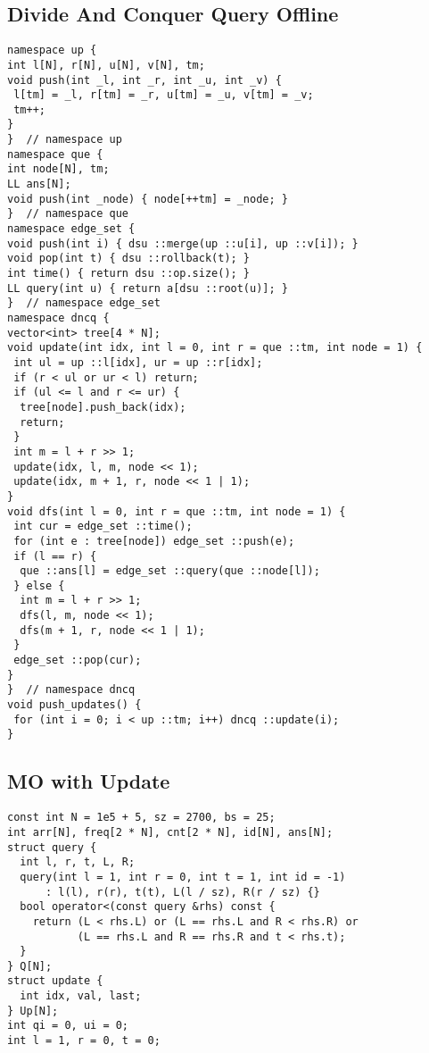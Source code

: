 \documentclass[a4paper,11pt,oneside]{article}
\begin{document}
\begin{multicols*}{\COLS}
\subsection{Divide And Conquer Query Offline}
\begin{lstlisting}
namespace up {
int l[N], r[N], u[N], v[N], tm;
void push(int _l, int _r, int _u, int _v) {
 l[tm] = _l, r[tm] = _r, u[tm] = _u, v[tm] = _v;
 tm++;
}
}  // namespace up
namespace que {
int node[N], tm;
LL ans[N];
void push(int _node) { node[++tm] = _node; }
}  // namespace que
namespace edge_set {
void push(int i) { dsu ::merge(up ::u[i], up ::v[i]); }
void pop(int t) { dsu ::rollback(t); }
int time() { return dsu ::op.size(); }
LL query(int u) { return a[dsu ::root(u)]; }
}  // namespace edge_set
namespace dncq {
vector<int> tree[4 * N];
void update(int idx, int l = 0, int r = que ::tm, int node = 1) {
 int ul = up ::l[idx], ur = up ::r[idx];
 if (r < ul or ur < l) return;
 if (ul <= l and r <= ur) {
  tree[node].push_back(idx);
  return;
 }
 int m = l + r >> 1;
 update(idx, l, m, node << 1);
 update(idx, m + 1, r, node << 1 | 1);
}
void dfs(int l = 0, int r = que ::tm, int node = 1) {
 int cur = edge_set ::time();
 for (int e : tree[node]) edge_set ::push(e);
 if (l == r) {
  que ::ans[l] = edge_set ::query(que ::node[l]);
 } else {
  int m = l + r >> 1;
  dfs(l, m, node << 1);
  dfs(m + 1, r, node << 1 | 1);
 }
 edge_set ::pop(cur);
}
}  // namespace dncq
void push_updates() {
 for (int i = 0; i < up ::tm; i++) dncq ::update(i);
}
\end{lstlisting}
\subsection{MO with Update}
\begin{lstlisting}
const int N = 1e5 + 5, sz = 2700, bs = 25;
int arr[N], freq[2 * N], cnt[2 * N], id[N], ans[N];
struct query {
  int l, r, t, L, R;
  query(int l = 1, int r = 0, int t = 1, int id = -1)
      : l(l), r(r), t(t), L(l / sz), R(r / sz) {}
  bool operator<(const query &rhs) const {
    return (L < rhs.L) or (L == rhs.L and R < rhs.R) or
           (L == rhs.L and R == rhs.R and t < rhs.t);
  }
} Q[N];
struct update {
  int idx, val, last;
} Up[N];
int qi = 0, ui = 0;
int l = 1, r = 0, t = 0;


\end{lstlisting}
\end{multicols*}
\end{document}
